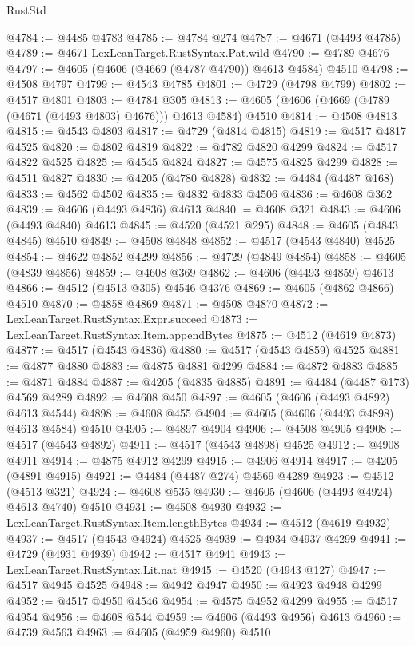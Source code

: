 \begin{lexlean}{RustStd}
\begin{coremodule}
@4784 := @4485 @4783
@4785 := @4784 @274
@4787 := @4671 (@4493 @4785)
@4789 := @4671 LexLeanTarget.RustSyntax.Pat.wild
@4790 := @4789 @4676
@4797 := @4605 (@4606 (@4669 (@4787 @4790)) @4613 @4584) @4510
@4798 := @4508 @4797
@4799 := @4543 @4785
@4801 := @4729 (@4798 @4799)
@4802 := @4517 @4801
@4803 := @4784 @305
@4813 := @4605 (@4606 (@4669 (@4789 (@4671 (@4493 @4803) @4676))) @4613 @4584) @4510
@4814 := @4508 @4813
@4815 := @4543 @4803
@4817 := @4729 (@4814 @4815)
@4819 := @4517 @4817 @4525
@4820 := @4802 @4819
@4822 := @4782 @4820 @4299
@4824 := @4517 @4822 @4525
@4825 := @4545 @4824
@4827 := @4575 @4825 @4299
@4828 := @4511 @4827
@4830 := @4205 (@4780 @4828)
@4832 := @4484 (@4487 @168)
@4833 := @4562 @4502
@4835 := @4832 @4833 @4506
@4836 := @4608 @362
@4839 := @4606 (@4493 @4836) @4613
@4840 := @4608 @321
@4843 := @4606 (@4493 @4840) @4613
@4845 := @4520 (@4521 @295)
@4848 := @4605 (@4843 @4845) @4510
@4849 := @4508 @4848
@4852 := @4517 (@4543 @4840) @4525
@4854 := @4622 @4852 @4299
@4856 := @4729 (@4849 @4854)
@4858 := @4605 (@4839 @4856)
@4859 := @4608 @369
@4862 := @4606 (@4493 @4859) @4613
@4866 := @4512 (@4513 @305) @4546 @4376
@4869 := @4605 (@4862 @4866) @4510
@4870 := @4858 @4869
@4871 := @4508 @4870
@4872 := LexLeanTarget.RustSyntax.Expr.succeed
@4873 := LexLeanTarget.RustSyntax.Item.appendBytes
@4875 := @4512 (@4619 @4873)
@4877 := @4517 (@4543 @4836)
@4880 := @4517 (@4543 @4859) @4525
@4881 := @4877 @4880
@4883 := @4875 @4881 @4299
@4884 := @4872 @4883
@4885 := @4871 @4884
@4887 := @4205 (@4835 @4885)
@4891 := @4484 (@4487 @173) @4569 @4289
@4892 := @4608 @450
@4897 := @4605 (@4606 (@4493 @4892) @4613 @4544)
@4898 := @4608 @455
@4904 := @4605 (@4606 (@4493 @4898) @4613 @4584) @4510
@4905 := @4897 @4904
@4906 := @4508 @4905
@4908 := @4517 (@4543 @4892)
@4911 := @4517 (@4543 @4898) @4525
@4912 := @4908 @4911
@4914 := @4875 @4912 @4299
@4915 := @4906 @4914
@4917 := @4205 (@4891 @4915)
@4921 := @4484 (@4487 @274) @4569 @4289
@4923 := @4512 (@4513 @321)
@4924 := @4608 @535
@4930 := @4605 (@4606 (@4493 @4924) @4613 @4740) @4510
@4931 := @4508 @4930
@4932 := LexLeanTarget.RustSyntax.Item.lengthBytes
@4934 := @4512 (@4619 @4932)
@4937 := @4517 (@4543 @4924) @4525
@4939 := @4934 @4937 @4299
@4941 := @4729 (@4931 @4939)
@4942 := @4517 @4941
@4943 := LexLeanTarget.RustSyntax.Lit.nat
@4945 := @4520 (@4943 @127)
@4947 := @4517 @4945 @4525
@4948 := @4942 @4947
@4950 := @4923 @4948 @4299
@4952 := @4517 @4950 @4546
@4954 := @4575 @4952 @4299
@4955 := @4517 @4954
@4956 := @4608 @544
@4959 := @4606 (@4493 @4956) @4613
@4960 := @4739 @4563
@4963 := @4605 (@4959 @4960) @4510

\end{coremodule}
\end{lexlean}
